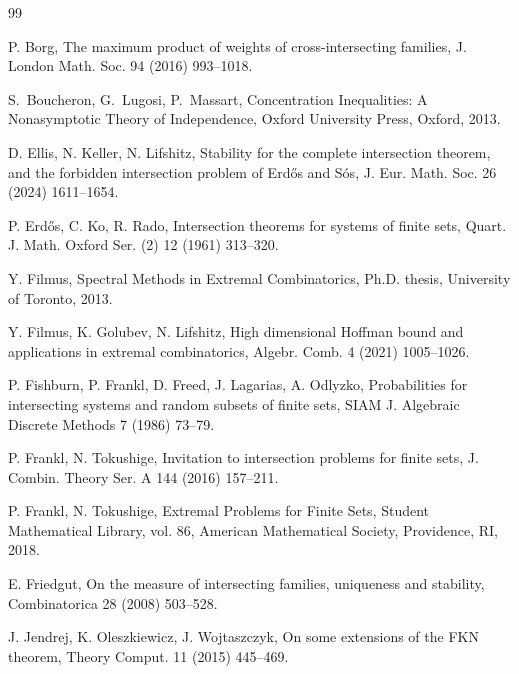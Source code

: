 \documentclass[11pt]{article}
\numberwithin{equation}{section}
\theoremstyle{definition}
\theoremstyle{remark}
\begin{document}
\begin{thebibliography}{99}

P. Borg,
The maximum product of weights of cross-intersecting families,
J. London Math. Soc. 94 (2016) 993--1018.

S.~Boucheron, G.~Lugosi, P.~Massart, Concentration Inequalities: A Nonasymptotic Theory of Independence, Oxford University Press, Oxford, 2013.

D. Ellis, N. Keller, N. Lifshitz,
Stability for the complete intersection theorem, and the forbidden intersection problem of Erd\H{o}s and S\'os,
J. Eur. Math. Soc. 26 (2024) 1611--1654.

P. Erd\H{o}s, C. Ko, R. Rado,
Intersection theorems for systems of finite sets,
Quart. J. Math. Oxford Ser. (2) 12 (1961) 313--320.

Y. Filmus,
Spectral Methods in Extremal Combinatorics,
Ph.D. thesis, University of Toronto, 2013.

Y. Filmus, K. Golubev, N. Lifshitz,
High dimensional Hoffman bound and applications in extremal combinatorics,
Algebr. Comb. 4 (2021) 1005--1026.

P.  Fishburn, P. Frankl, D. Freed, J. Lagarias, A. Odlyzko,
Probabilities for intersecting systems and random subsets of finite sets,
SIAM J. Algebraic Discrete Methods 7 (1986) 73--79.





P. Frankl,  N. Tokushige,
Invitation to intersection problems for finite sets,
J. Combin. Theory Ser. A 144 (2016) 157--211.

P. Frankl, N. Tokushige,
Extremal Problems for Finite Sets,
Student Mathematical Library, vol. 86, American Mathematical Society, Providence, RI, 2018.

E. Friedgut,
On the measure of intersecting families, uniqueness and stability,
Combinatorica 28 (2008) 503--528.


J. Jendrej, K. Oleszkiewicz, J.  Wojtaszczyk,
On some extensions of the FKN theorem,
Theory Comput. 11 (2015) 445--469.


\end{thebibliography}
\end{document}
